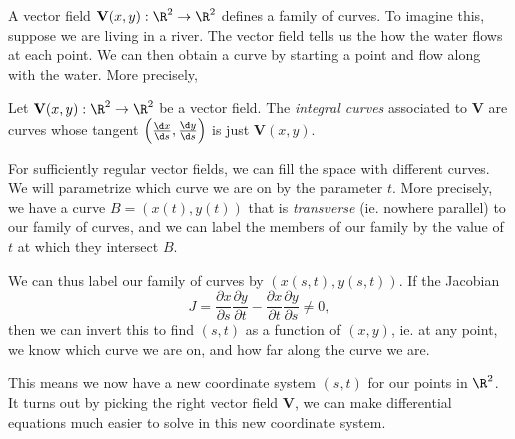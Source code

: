 \documentclass[a4paper]{article}
\begin{document}
A vector field $\mathbf{V}(x, y): \R^2 \to \R^2$ defines a family of curves. To imagine this, suppose we are living in a river. The vector field tells us the how the water flows at each point. We can then obtain a curve by starting a point and flow along with the water. More precisely,
\begin{defi}
  Let $\mathbf{V}(x, y): \R^2 \to \R^2$ be a vector field. The \emph{integral curves} associated to $\mathbf{V}$ are curves whose tangent $\left(\frac{\d x}{\d s}, \frac{\d y}{\d s}\right)$ is just $\mathbf{V}(x, y)$.
\end{defi}
For sufficiently regular vector fields, we can fill the space with different curves. We will parametrize which curve we are on by the parameter $t$. More precisely, we have a curve $B = (x(t), y(t))$ that is \emph{transverse} (ie. nowhere parallel) to our family of curves, and we can label the members of our family by the value of $t$ at which they intersect $B$.
\begin{center}
\end{center}
We can thus label our family of curves by $(x(s, t), y(s, t))$. If the Jacobian
\[
  J = \frac{\partial x}{\partial s} \frac{\partial y}{\partial t} - \frac{\partial x}{\partial t} \frac{\partial y}{\partial s} \not= 0,
\]
then we can invert this to find $(s, t)$ as a function of $(x, y)$, ie. at any point, we know which curve we are on, and how far along the curve we are.

This means we now have a new coordinate system $(s, t)$ for our points in $\R^2$. It turns out by picking the right vector field $\mathbf{V}$, we can make differential equations much easier to solve in this new coordinate system.
\end{document}
